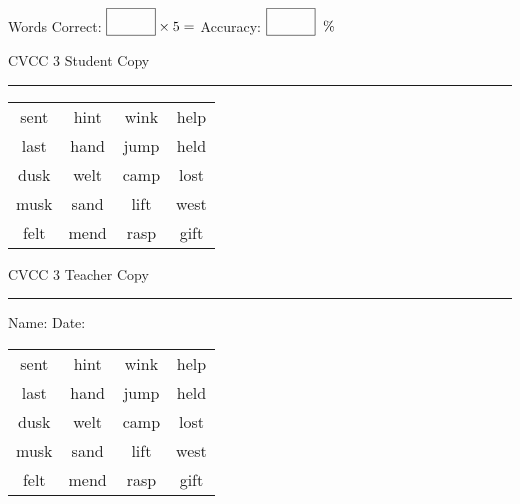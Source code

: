 \documentclass{memoir}
\begin{document}
\small

Words Correct: $\fbox{\phantom{\huge 100}} \times 5 = $ Accuracy: $\fbox{\phantom{\huge 100}}\;\; \%$ 

\vfill

\newpage


\footnotesize \noindent
CVCC 3 \hfill Student Copy
\smallskip
\hrule

\Large

\setlength{\tabcolsep}{14pt}
\def\arraystretch{3}

{\selectfont


\begin{vplace}[0.5]
\begin{center}
\begin{tabular}{cccc}
sent & hint & wink & help \\
last & hand & jump & held \\
dusk & welt & camp & lost \\
musk & sand & lift & west \\
felt & mend & rasp & gift \\
\end{tabular}
\end{center}
\end{vplace}

}

\newpage

\footnotesize \noindent
CVCC 3 \hfill Teacher Copy
\smallskip
\hrule

\small

\vfill

\noindent
Name: \underline{\hspace{1.75in}} \hfill Date: \underline{\hspace{1in}}

\Large

{\selectfont


\begin{vplace}[0.5]
\begin{center}
\begin{tabular}{cccc}
sent & hint & wink & help \\
last & hand & jump & held \\
dusk & welt & camp & lost \\
musk & sand & lift & west \\
felt & mend & rasp & gift \\
\end{tabular}
\end{center}
\end{vplace}



}
\end{document}

